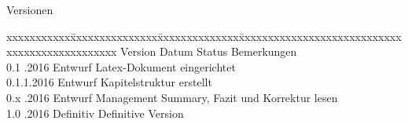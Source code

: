 
\null
\vfill

\begin{Large}
Versionen
\end{Large}

\fontsize{10pt}{18pt}\selectfont
\begin{tabbing}
xxxxxxxxxxx\=xxxxxxxxxxxxxxx\=xxxxxxxxxxxxxx\=xxxxxxxxxxxxxxxxxxxxxxxxxxxxxxxxxxxxxxxxxxxxxxx \kill
Version	\> Datum	\> Status		\> Bemerkungen		\\
0.1	.2016	\> Entwurf		\> Latex-Dokument eingerichtet	\\
0.1.1.2016	\> Entwurf		\> Kapitelstruktur erstellt \\
0.x	.2016	\> Entwurf		\> Management Summary, Fazit und Korrektur lesen	\\
1.0	.2016	\> Definitiv	\> Definitive Version	\\


\end{tabbing}

